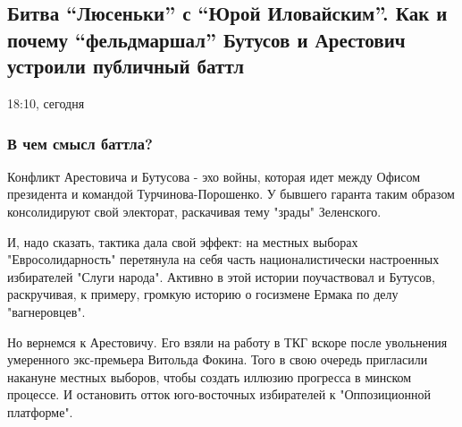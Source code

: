  
 
 

\subsection{Битва \enquote{Люсеньки} с \enquote{Юрой Иловайским}. Как и почему \enquote{фельдмаршал} Бутусов и Арестович устроили публичный баттл}
\label{sec:18_11_2020.news.ua.strana.1.battle_ljusenka_jura_ilovajskii}
\par 18:10, сегодня



\subsubsection{В чем смысл баттла?}

Конфликт Арестовича и Бутусова - эхо войны, которая идет между Офисом
президента и командой Турчинова-Порошенко. У бывшего гаранта таким образом
консолидируют свой электорат, раскачивая тему "зрады" Зеленского.

И, надо сказать, тактика дала свой эффект: на местных выборах
"Евросолидарность" перетянула на себя часть националистически настроенных
избирателей "Слуги народа". Активно в этой истории поучаствовал и Бутусов,
раскручивая, к примеру, громкую историю о госизмене Ермака по делу
"вагнеровцев". 

Но вернемся к Арестовичу. Его взяли на работу в ТКГ вскоре после
увольнения умеренного экс-премьера Витольда Фокина. Того в свою очередь
пригласили накануне местных выборов, чтобы создать иллюзию прогресса в
минском процессе. И остановить отток юго-восточных избирателей к
"Оппозиционной платформе". 

